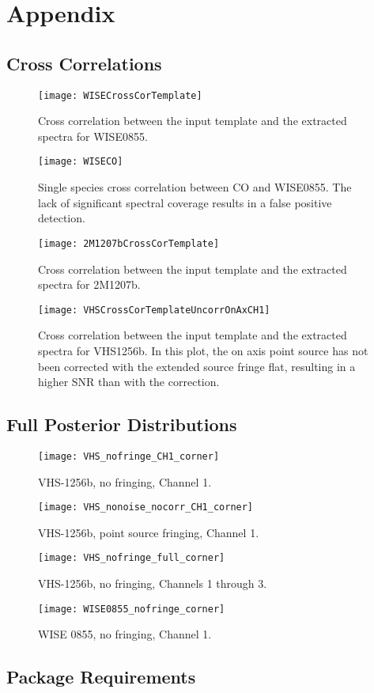 \appendix
\chapter{Appendix}
\section{Cross Correlations}
\begin{figure}[h]
	\texttt{[image: WISECrossCorTemplate]}
	\caption{Cross correlation between the input template and the extracted spectra for WISE0855.}
\end{figure}
\begin{figure}[h]
	\texttt{[image: WISECO]}
	\caption{Single species cross correlation between CO and WISE0855. The lack of significant spectral coverage results in a false positive detection.}
	\label{fig:wiseco}
\end{figure}
\begin{figure}[h]
	\texttt{[image: 2M1207bCrossCorTemplate]}
	\caption{Cross correlation between the input template and the extracted spectra for 2M1207b.}
\end{figure}
\begin{figure}[h]
	\texttt{[image: VHSCrossCorTemplateUncorrOnAxCH1]}
	\caption{Cross correlation between the input template and the extracted spectra for VHS1256b. In this plot, the on axis point source has not been corrected with the extended source fringe flat, resulting in a higher SNR than with the correction.}
\end{figure}

\clearpage
\section{Full Posterior Distributions}\label{app:post}
\begin{figure}[h]
	\centering
	\texttt{[image: VHS\_nofringe\_CH1\_corner]}
	\caption{VHS-1256b, no fringing, Channel 1.}
\end{figure}
\begin{figure}[h]
	\centering
	\texttt{[image: VHS\_nonoise\_nocorr\_CH1\_corner]}
	\caption{VHS-1256b, point source fringing, Channel 1.}
\end{figure}
\begin{figure}[h]
	\centering
	\texttt{[image: VHS\_nofringe\_full\_corner]}
	\caption{VHS-1256b, no fringing, Channels 1 through 3.}
\end{figure}
\begin{figure}[h]
	\centering
	\texttt{[image: WISE0855\_nofringe\_corner]}
	\caption{WISE 0855, no fringing, Channel 1.}
\end{figure}
\clearpage
\section{Package Requirements}

